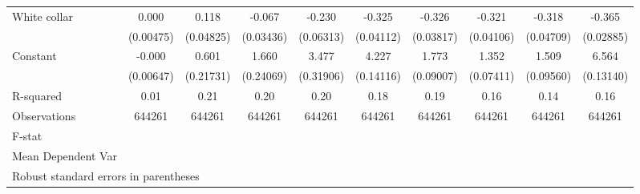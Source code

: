 {\begin{tabular}{l*{9}{c}}
White collar        &       0.000         &       0.118\sym{*}  &      -0.067         &      -0.230\sym{***}&      -0.325\sym{***}&      -0.326\sym{***}&      -0.321\sym{***}&      -0.318\sym{***}&      -0.365\sym{***}\\
                    &   (0.00475)         &   (0.04825)         &   (0.03436)         &   (0.06313)         &   (0.04112)         &   (0.03817)         &   (0.04106)         &   (0.04709)         &   (0.02885)         \\
Constant            &      -0.000         &       0.601\sym{**} &       1.660\sym{***}&       3.477\sym{***}&       4.227\sym{***}&       1.773\sym{***}&       1.352\sym{***}&       1.509\sym{***}&       6.564\sym{***}\\
                    &   (0.00647)         &   (0.21731)         &   (0.24069)         &   (0.31906)         &   (0.14116)         &   (0.09007)         &   (0.07411)         &   (0.09560)         &   (0.13140)         \\
\hline
R-squared           &        0.01         &        0.21         &        0.20         &        0.20         &        0.18         &        0.19         &        0.16         &        0.14         &        0.16         \\
Observations        &      644261         &      644261         &      644261         &      644261         &      644261         &      644261         &      644261         &      644261         &      644261         \\
F-stat              &                     &                     &                     &                     &                     &                     &                     &                     &                     \\
Mean Dependent Var  &                     &                     &                     &                     &                     &                     &                     &                     &                     \\
\hline\hline
\multicolumn{10}{l}{\footnotesize Robust standard errors in parentheses}\\
\end{tabular}
}
